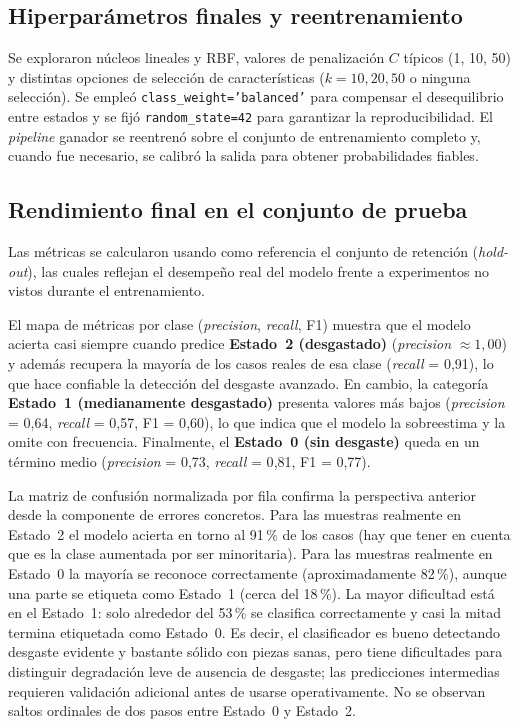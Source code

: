 \documentclass[12pt, letterpaper]{report}
\begin{document}
\subsection{Hiperparámetros finales y reentrenamiento}

Se exploraron núcleos lineales y RBF, valores de penalización $C$ típicos (1, 10, 50) y distintas opciones de selección de características ($k = 10, 20, 50$ o ninguna selección). Se empleó \texttt{class\_weight='balanced'} para compensar el desequilibrio entre estados y se fijó \texttt{random\_state=42} para garantizar la reproducibilidad. El \textit{pipeline} ganador se reentrenó sobre el conjunto de entrenamiento completo y, cuando fue necesario, se calibró la salida para obtener probabilidades fiables.

\subsection{Rendimiento final en el conjunto de prueba}

Las métricas se calcularon usando como referencia el conjunto de retención (\textit{hold-out}), las cuales reflejan el desempeño real del modelo frente a experimentos no vistos durante el entrenamiento.

El mapa de métricas por clase (\textit{precision}, \textit{recall}, F1) muestra que el modelo acierta casi siempre cuando predice \textbf{Estado~2 (desgastado)} (\textit{precision} $\approx 1{,}00$) y además recupera la mayoría de los casos reales de esa clase (\textit{recall} = 0{,}91), lo que hace confiable la detección del desgaste avanzado. En cambio, la categoría \textbf{Estado~1 (medianamente desgastado)} presenta valores más bajos (\textit{precision} = 0{,}64, \textit{recall} = 0{,}57, F1 = 0{,}60), lo que indica que el modelo la sobreestima y la omite con frecuencia. Finalmente, el \textbf{Estado~0 (sin desgaste)} queda en un término medio (\textit{precision} = 0{,}73, \textit{recall} = 0{,}81, F1 = 0{,}77).

La matriz de confusión normalizada por fila confirma la perspectiva anterior desde la componente de errores concretos. Para las muestras realmente en Estado~2 el modelo acierta en torno al 91\,\% de los casos (hay que tener en cuenta que es la clase aumentada por ser minoritaria). Para las muestras realmente en Estado~0 la mayoría se reconoce correctamente (aproximadamente 82\,\%), aunque una parte se etiqueta como Estado~1 (cerca del 18\,\%). La mayor dificultad está en el Estado~1: solo alrededor del 53\,\% se clasifica correctamente y casi la mitad termina etiquetada como Estado~0. Es decir, el clasificador es bueno detectando desgaste evidente y bastante sólido con piezas sanas, pero tiene dificultades para distinguir degradación leve de ausencia de desgaste; las predicciones intermedias requieren validación adicional antes de usarse operativamente. No se observan saltos ordinales de dos pasos entre Estado~0 y Estado~2.
\end{document}
